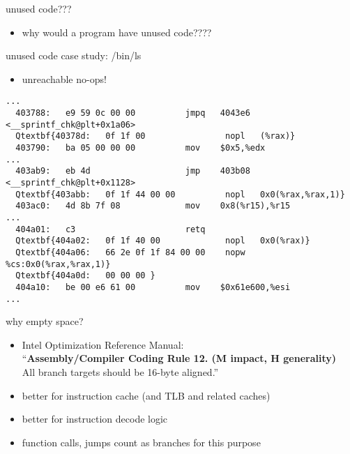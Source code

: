 \begin{frame}{unused code???}
    \begin{itemize}
    \item why would a program have unused code????
    \end{itemize}
\end{frame}

\begin{frame}[fragile,label=lsStudy1]{unused code case study: /bin/ls}
    \begin{itemize}
    \item unreachable no-ops!
    \end{itemize}
\begin{Verbatim}[fontsize=\fontsize{9}{10}\selectfont,commandchars=Q\{\}]
...
  403788:	e9 59 0c 00 00       	jmpq   4043e6 <__sprintf_chk@plt+0x1a06>
  Qtextbf{40378d:	0f 1f 00             	nopl   (%rax)}
  403790:	ba 05 00 00 00       	mov    $0x5,%edx
...
  403ab9:	eb 4d                	jmp    403b08 <__sprintf_chk@plt+0x1128>
  Qtextbf{403abb:	0f 1f 44 00 00       	nopl   0x0(%rax,%rax,1)}
  403ac0:	4d 8b 7f 08          	mov    0x8(%r15),%r15
...
  404a01:	c3                   	retq   
  Qtextbf{404a02:	0f 1f 40 00          	nopl   0x0(%rax)}
  Qtextbf{404a06:	66 2e 0f 1f 84 00 00 	nopw   %cs:0x0(%rax,%rax,1)}
  Qtextbf{404a0d:	00 00 00 }
  404a10:	be 00 e6 61 00       	mov    $0x61e600,%esi
...
\end{Verbatim}
\end{frame}

\begin{frame}{why empty space?}
\begin{itemize}
\item Intel Optimization Reference Manual: \\
``\textbf{Assembly/Compiler Coding Rule 12. (M impact, H generality)} \\All branch targets should be 16-byte aligned.''
\vspace{.5cm}
    \item better for instruction cache {\small (and TLB and related caches)}
    \item better for instruction decode logic
    \item function calls, jumps count as branches for this purpose
\end{itemize}
\end{frame}

